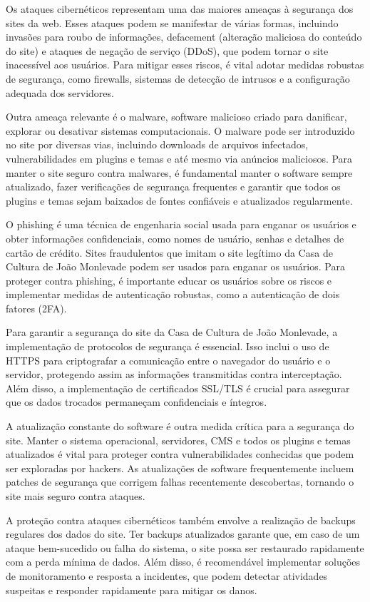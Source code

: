 Os ataques cibernéticos representam uma das maiores ameaças à segurança dos sites da web. Esses ataques podem se manifestar de várias formas, incluindo invasões para roubo de informações, defacement (alteração maliciosa do conteúdo do site) e ataques de negação de serviço (DDoS), que podem tornar o site inacessível aos usuários. Para mitigar esses riscos, é vital adotar medidas robustas de segurança, como firewalls, sistemas de detecção de intrusos e a configuração adequada dos servidores.

Outra ameaça relevante é o malware, software malicioso criado para danificar, explorar ou desativar sistemas computacionais. O malware pode ser introduzido no site por diversas vias, incluindo downloads de arquivos infectados, vulnerabilidades em plugins e temas e até mesmo via anúncios maliciosos. Para manter o site seguro contra malwares, é fundamental manter o software sempre atualizado, fazer verificações de segurança frequentes e garantir que todos os plugins e temas sejam baixados de fontes confiáveis e atualizados regularmente.

O phishing é uma técnica de engenharia social usada para enganar os usuários e obter informações confidenciais, como nomes de usuário, senhas e detalhes de cartão de crédito. Sites fraudulentos que imitam o site legítimo da Casa de Cultura de João Monlevade podem ser usados para enganar os usuários. Para proteger contra phishing, é importante educar os usuários sobre os riscos e implementar medidas de autenticação robustas, como a autenticação de dois fatores (2FA).

Para garantir a segurança do site da Casa de Cultura de João Monlevade, a implementação de protocolos de segurança é essencial. Isso inclui o uso de HTTPS para criptografar a comunicação entre o navegador do usuário e o servidor, protegendo assim as informações transmitidas contra interceptação. Além disso, a implementação de certificados SSL/TLS é crucial para assegurar que os dados trocados permaneçam confidenciais e íntegros.

A atualização constante do software é outra medida crítica para a segurança do site. Manter o sistema operacional, servidores, CMS e todos os plugins e temas atualizados é vital para proteger contra vulnerabilidades conhecidas que podem ser exploradas por hackers. As atualizações de software frequentemente incluem patches de segurança que corrigem falhas recentemente descobertas, tornando o site mais seguro contra ataques.

A proteção contra ataques cibernéticos também envolve a realização de backups regulares dos dados do site. Ter backups atualizados garante que, em caso de um ataque bem-sucedido ou falha do sistema, o site possa ser restaurado rapidamente com a perda mínima de dados. Além disso, é recomendável implementar soluções de monitoramento e resposta a incidentes, que podem detectar atividades suspeitas e responder rapidamente para mitigar os danos.

